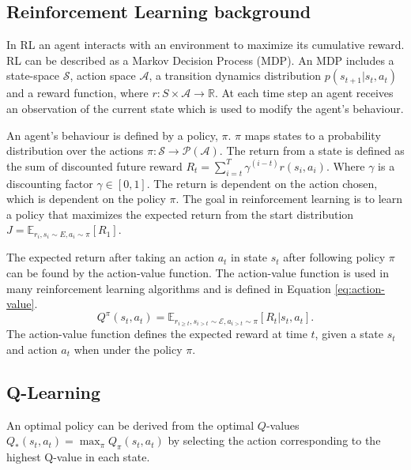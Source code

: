 \documentclass[conference]{IEEEtran}
\begin{document}
\subsection{Reinforcement Learning background}


In RL an agent interacts with an environment to maximize its cumulative reward. RL can be described as a Markov Decision Process (MDP). An MDP includes a state-space $\mathcal{S}$, action space $\mathcal{A}$, a transition dynamics distribution $p(s_{t+1}|s_t,a_t)$ and a reward function, where $r:S\times \mathcal{A} \rightarrow \mathbb{R}$. At each time step an agent receives an observation of the current state which is used to modify the agent's behaviour.

An agent's behaviour is defined by a policy, $\pi$. $\pi$ maps states to a probability distribution over the actions $\pi:\mathcal{S}\rightarrow \mathcal{P}(\mathcal{A})$. The return from a state is defined as the sum of discounted future reward $R_t=\sum_{i=t}^T\gamma^{(i-t)}r(s_i,a_i)$. Where $\gamma$ is a discounting factor $\gamma \in [0,1]$. The return is dependent on the action chosen, which is dependent on the policy $\pi$. The goal in reinforcement learning is to learn a policy that maximizes the expected return from the start distribution $J=\mathbb{E}_{r_i,s_i \sim E,a_i \sim \pi}[R_1]$. 

The expected return after taking an action $a_t$ in state $s_t$ after following policy $\pi$ can be found by the action-value function. The action-value function is used in many reinforcement learning algorithms and is defined in Equation \ref{eq:action-value}.
\begin{equation}
	\label{eq:action-value}
	Q^{\pi}(s_t,a_t)=\mathbb{E}_{r_{i\geq t},s_{i>t}\sim \mathcal{E},a_{i>t}\sim\pi}[R_t|s_t,a_t].
\end{equation}
\noindent The action-value function defines the expected reward at time $t$, given a state $s_t$ and action $a_t$ when under the policy $\pi$.

\subsection{Q-Learning}

 An optimal policy can be derived from the optimal $Q$-values $Q_*(s_t,a_t)=\max_\pi Q_\pi(s_t,a_t)$ by selecting the action corresponding to the highest Q-value in each state.
\end{document}
